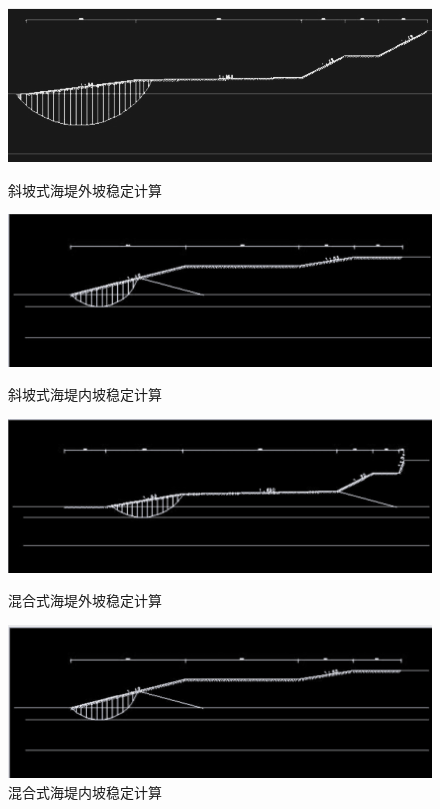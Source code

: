 \documentclass[UTF8, a4paper, 12pt]{ctexart} %
\begin{document}
\begin{figure}[h]
    \centering
    \begin{minipage}[b]{0.45\textwidth}
        \centering
        \includegraphics[width=\textwidth]{66.png}
        \caption{斜坡式海堤外坡稳定计算}
        \label{fig:slope_outer}
    \end{minipage}
    \hfill
    \begin{minipage}[b]{0.45\textwidth}
        \centering
        \includegraphics[width=\textwidth]{67.png}
        \caption{斜坡式海堤内坡稳定计算}
        \label{fig:slope_inner}
    \end{minipage}
    \vspace{0.5cm}
    \begin{minipage}[b]{0.45\textwidth}
        \centering
        \includegraphics[width=\textwidth]{68.png}
        \caption{混合式海堤外坡稳定计算}
        \label{fig:mixed_outer}
    \end{minipage}
    \hfill
    \begin{minipage}[b]{0.45\textwidth}
        \centering
        \includegraphics[width=\textwidth]{69.png}
        \caption{混合式海堤内坡稳定计算}
        \label{fig:mixed_inner}
    \end{minipage}
\end{figure}
\newpage
\end{document}
